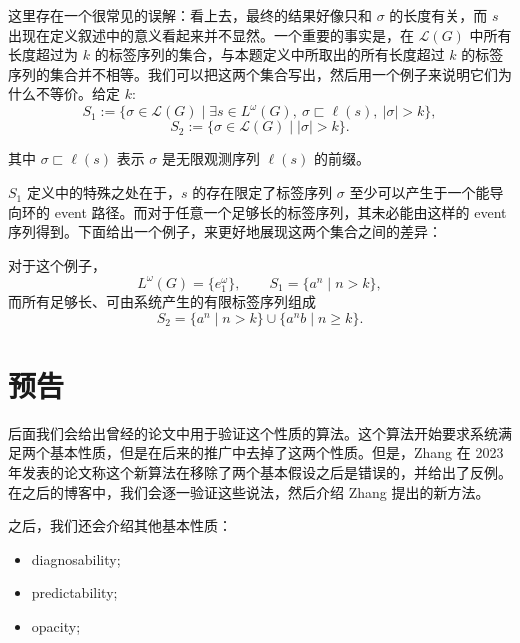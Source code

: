 \documentclass[11pt,a4paper]{ctexart}
\begin{document}
这里存在一个很常见的误解：看上去，最终的结果好像只和 $\sigma$ 的长度有关，而 $s$ 出现在定义叙述中的意义看起来并不显然。一个重要的事实是，在 $\mathcal{L}(G)$ 中所有长度超过为 $k$ 的标签序列的集合，与本题定义中所取出的所有长度超过 $k$ 的标签序列的集合并不相等。我们可以把这两个集合写出，然后用一个例子来说明它们为什么不等价。给定 $k$:
\[
S_1 := \{\sigma\in\mathcal{L}(G)\mid \exists s\in L^\omega(G),\ \sigma\sqsubset\ell(s),\ |\sigma|>k\},
\]
\[
S_2 := \{\sigma\in\mathcal{L}(G)\mid |\sigma|>k\}.
\]

其中 $\sigma\sqsubset\ell(s)$ 表示 $\sigma$ 是无限观测序列 $\ell(s)$ 的前缀。

$S_1$ 定义中的特殊之处在于，$s$ 的存在限定了标签序列 $\sigma$ 至少可以产生于一个能导向环的 event 路径。而对于任意一个足够长的标签序列，其未必能由这样的 event 序列得到。下面给出一个例子，来更好地展现这两个集合之间的差异：

\begin{figure}[H]
\centering
{}
\end{figure}

对于这个例子，
\[
L^\omega(G)=\{e_1^\omega\},\qquad S_1=\{a^n\mid n>k\},
\]
而所有足够长、可由系统产生的有限标签序列组成
\[
S_2=\{a^n\mid n>k\}\cup\{a^n b\mid n\ge k\}.
\]

\section*{预告}

后面我们会给出曾经的论文中用于验证这个性质的算法。这个算法开始要求系统满足两个基本性质，但是在后来的推广中去掉了这两个性质。但是，Zhang 在 2023 年发表的论文称这个新算法在移除了两个基本假设之后是错误的，并给出了反例。在之后的博客中，我们会逐一验证这些说法，然后介绍 Zhang 提出的新方法。

之后，我们还会介绍其他基本性质：
\begin{itemize}
  \item diagnosability;
  \item predictability;
  \item opacity;
\end{itemize}
\end{document}
